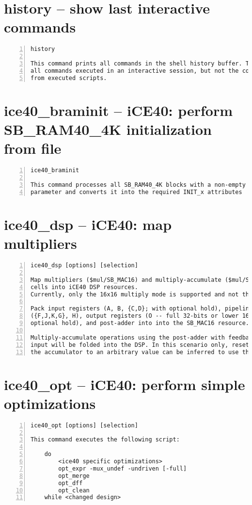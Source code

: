 \section{history -- show last interactive commands}
\label{cmd:history}
\begin{lstlisting}[numbers=left,frame=single]
    history

This command prints all commands in the shell history buffer. This are
all commands executed in an interactive session, but not the commands
from executed scripts.
\end{lstlisting}

\section{ice40\_braminit -- iCE40: perform SB\_RAM40\_4K initialization from file}
\label{cmd:ice40_braminit}
\begin{lstlisting}[numbers=left,frame=single]
    ice40_braminit

This command processes all SB_RAM40_4K blocks with a non-empty INIT_FILE
parameter and converts it into the required INIT_x attributes
\end{lstlisting}

\section{ice40\_dsp -- iCE40: map multipliers}
\label{cmd:ice40_dsp}
\begin{lstlisting}[numbers=left,frame=single]
    ice40_dsp [options] [selection]

Map multipliers ($mul/SB_MAC16) and multiply-accumulate ($mul/SB_MAC16 + $add)
cells into iCE40 DSP resources.
Currently, only the 16x16 multiply mode is supported and not the 2 x 8x8 mode.

Pack input registers (A, B, {C,D}; with optional hold), pipeline registers
({F,J,K,G}, H), output registers (O -- full 32-bits or lower 16-bits only; with
optional hold), and post-adder into into the SB_MAC16 resource.

Multiply-accumulate operations using the post-adder with feedback on the {C,D}
input will be folded into the DSP. In this scenario only, resetting the
the accumulator to an arbitrary value can be inferred to use the {C,D} input.
\end{lstlisting}

\section{ice40\_opt -- iCE40: perform simple optimizations}
\label{cmd:ice40_opt}
\begin{lstlisting}[numbers=left,frame=single]
    ice40_opt [options] [selection]

This command executes the following script:

    do
        <ice40 specific optimizations>
        opt_expr -mux_undef -undriven [-full]
        opt_merge
        opt_dff
        opt_clean
    while <changed design>
\end{lstlisting}

